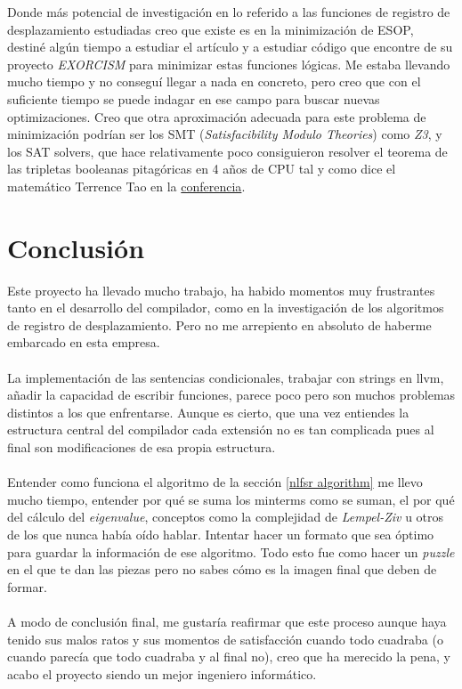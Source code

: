 Donde más potencial de investigación en lo referido a las funciones de registro de desplazamiento estudiadas creo que existe es en la minimización de ESOP, destiné algún tiempo a estudiar el artículo \cite{mishchenko2001fast} y a estudiar código que encontre de su proyecto \textit{EXORCISM} para minimizar estas funciones lógicas. Me estaba llevando mucho tiempo y no conseguí llegar a nada en concreto, pero creo que con el suficiente tiempo se puede indagar en ese campo para buscar nuevas optimizaciones. Creo que otra aproximación adecuada para este problema de minimización podrían ser los SMT (\textit{Satisfacibility Modulo Theories}) como \textit{Z3}, y los SAT solvers, que hace relativamente poco consiguieron resolver el teorema de las tripletas booleanas pitagóricas en 4 años de CPU tal y como dice el matemático Terrence Tao en la \href{https://www.youtube.com/watch?v=e049IoFBnLA&t=1061s}{conferencia}.
\section{Conclusión}
Este proyecto ha llevado mucho trabajo, ha habido momentos muy frustrantes tanto en el desarrollo del compilador, como en la investigación de los algoritmos de registro de desplazamiento. Pero no me arrepiento en absoluto de haberme embarcado en esta empresa. \\\\
La implementación de las sentencias condicionales, trabajar con strings en llvm, añadir la capacidad de escribir funciones, parece poco pero son muchos problemas distintos a los que enfrentarse. Aunque es cierto, que una vez entiendes la estructura central del compilador cada extensión no es tan complicada pues al final son modificaciones de esa propia estructura.\\\\
Entender como funciona el algoritmo de la sección \ref{nlfsr algorithm} me llevo mucho tiempo, entender por qué se suma los minterms como se suman, el por qué del cálculo del \textit{eigenvalue}, conceptos como la complejidad de \textit{Lempel-Ziv} u otros de los que nunca había oído hablar. Intentar hacer un formato que sea óptimo para guardar la información de ese algoritmo. Todo esto fue como hacer un \textit{puzzle} en el que te dan las piezas pero no sabes cómo es la imagen final que deben de formar.\\\\
A modo de conclusión final, me gustaría reafirmar que este proceso aunque haya tenido sus malos ratos y sus momentos de satisfacción cuando todo cuadraba (o cuando parecía que todo cuadraba y al final no), creo que ha merecido la pena, y acabo el proyecto siendo un mejor ingeniero informático.